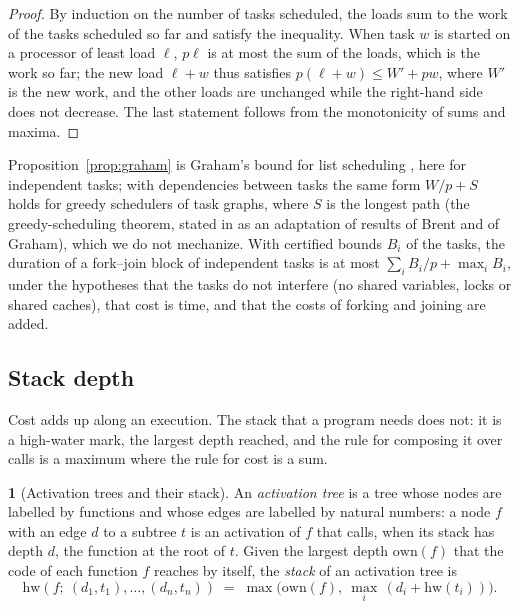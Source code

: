 \documentclass[oneside,english]{amsart}
\numberwithin{equation}{section}
\numberwithin{figure}{section}
\theoremstyle{plain}
\theoremstyle{definition}
\newtheorem{defn}[thm]{\protect\definitionname}
\theoremstyle{plain}
\theoremstyle{remark}
\theoremstyle{plain}
\theoremstyle{definition}
\theoremstyle{plain}
\theoremstyle{remark}
\providecommand{\definitionname}{Definition}
\begin{document}
\begin{proof}
By induction on the number of tasks scheduled, the loads sum to the work of the tasks scheduled so far and satisfy the inequality. When task $w$ is started on a processor of least load $\ell$, $p\ell$ is at most the sum of the loads, which is the work so far; the new load $\ell + w$ thus satisfies $p(\ell + w) \le W' + pw$, where $W'$ is the new work, and the other loads are unchanged while the right-hand side does not decrease. The last statement follows from the monotonicity of sums and maxima.
\end{proof}

Proposition~\ref{prop:graham} is Graham's bound for list scheduling \cite{graham1966bounds}, here for independent tasks; with dependencies between tasks the same form $W/p + S$ holds for greedy schedulers of task graphs, where $S$ is the longest path (the greedy-scheduling theorem, stated in \cite{blumofe1999scheduling} as an adaptation of results of Brent and of Graham), which we do not mechanize. With certified bounds $B_i$ of the tasks, the duration of a fork--join block of independent tasks is at most $\sum_i B_i / p + \max_i B_i$, under the hypotheses that the tasks do not interfere (no shared variables, locks or shared caches), that cost is time, and that the costs of forking and joining are added.

\subsection{Stack depth}
\label{subsec:stack}

Cost adds up along an execution. The stack that a program needs does not: it is a high-water mark, the largest depth reached, and the rule for composing it over calls is a maximum where the rule for cost is a sum.

\begin{defn}[Activation trees and their stack]
\label{def:activation-tree}
An \emph{activation tree} is a tree whose nodes are labelled by functions and whose edges are labelled by natural numbers: a node $f$ with an edge $d$ to a subtree $t$ is an activation of $f$ that calls, when its stack has depth $d$, the function at the root of $t$. Given the largest depth $\mathrm{own}(f)$ that the code of each function $f$ reaches by itself, the \emph{stack} of an activation tree is
\[
  \mathrm{hw}(f;\ (d_1, t_1), \dots, (d_n, t_n)) \;=\; \max\bigl(\mathrm{own}(f),\ \max_i\, (d_i + \mathrm{hw}(t_i))\bigr).
\]
\end{defn}
\end{document}
